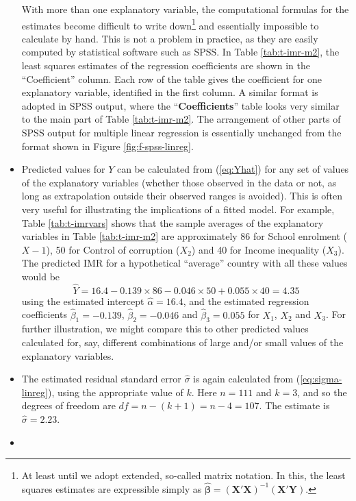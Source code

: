 \documentclass[11pt,a4paper,openany]{book}
\let\rmarkdownfootnote\footnote%
\def\footnote{\protect\rmarkdownfootnote}
\begin{document}
\begin{itemize}
  With more than one explanatory variable, the computational formulas
  for the estimates become difficult to write down\footnote{At least
    until we adopt extended, so-called matrix notation. In this, the
    least squares estimates are expressible simply as
    \(\hat{\boldsymbol{\beta}}= (\mathbf{X}'\mathbf{X})^{-1}(\mathbf{X}'\mathbf{Y})\).}
  and essentially impossible to calculate by hand. This is not a problem
  in practice, as they are easily computed by statistical software such
  as SPSS. In Table \ref{tab:t-imr-m2}, the least squares estimates of
  the regression coefficients are shown in the ``Coefficient'' column.
  Each row of the table gives the coefficient for one explanatory
  variable, identified in the first column. A similar format is adopted
  in SPSS output, where the ``\textbf{Coefficients}'' table looks very
  similar to the main part of Table \ref{tab:t-imr-m2}. The arrangement
  of other parts of SPSS output for multiple linear regression is
  essentially unchanged from the format shown in Figure
  \ref{fig:f-spss-linreg}.
\item
  Predicted values for \(Y\) can be calculated from (\ref{eq:Yhat}) for
  any set of values of the explanatory variables (whether those observed
  in the data or not, as long as extrapolation outside their observed
  ranges is avoided). This is often very useful for illustrating the
  implications of a fitted model. For example, Table \ref{tab:t-imrvars}
  shows that the sample averages of the explanatory variables in Table
  \ref{tab:t-imr-m2} are approximately 86 for School enrolment
  (\(X-{1}\)), 50 for Control of corruption (\(X_{2}\)) and 40 for
  Income inequality (\(X_{3}\)). The predicted IMR for a hypothetical
  ``average'' country with all these values would be
  \[\hat{Y}=16.4-0.139\times 86-0.046\times 50+0.055\times 40=4.35\]
  using the estimated intercept \(\hat{\alpha}=16.4\), and the estimated
  regression coefficients \(\hat{\beta}_{1}=-0.139\),
  \(\hat{\beta}_{2}=-0.046\) and \(\hat{\beta}_{3}=0.055\) for
  \(X_{1}\), \(X_{2}\) and \(X_{3}\). For further illustration, we might
  compare this to other predicted values calculated for, say, different
  combinations of large and/or small values of the explanatory
  variables.
\item
  The estimated residual standard error \(\hat{\sigma}\) is again
  calculated from (\ref{eq:sigma-linreg}), using the appropriate value
  of \(k\). Here \(n=111\) and \(k=3\), and so the degrees of freedom
  are \(df=n-(k+1)=n-4=107\). The estimate is \(\hat{\sigma}=2.23\).
\item

\end{itemize}
\end{document}
